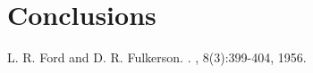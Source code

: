 \documentclass{acm_proc_article-sp}
\begin{document}
\section{Conclusions}

\begin{thebibliography}{1}
L. R. Ford and D. R. Fulkerson. . , 8(3):399-404, 1956.
\end{thebibliography}





%

%
%

\balancecolumns
\end{document}
